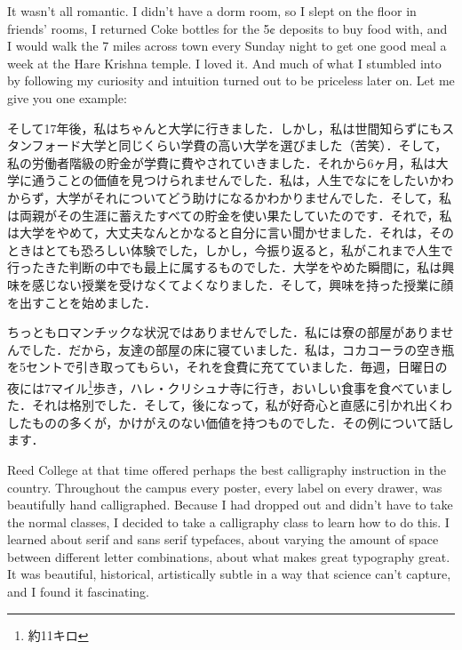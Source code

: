 \documentclass[twocolumn]{jsarticle}
\begin{document}
\vspace{\baselineskip}

It wasn't all romantic. I didn't have a dorm room, so I slept on the floor in friends' rooms, I returned Coke bottles for the 5¢ deposits to buy food with, and I would walk the 7 miles across town every Sunday night to get one good meal a week at the Hare Krishna temple. I loved it. And much of what I stumbled into by following my curiosity and intuition turned out to be priceless later on. Let me give you one example:

\newpage

そして17年後，私はちゃんと大学に行きました．しかし，私は世間知らずにもスタンフォード大学と同じくらい学費の高い大学を選びました（苦笑）．そして，私の労働者階級の貯金が学費に費やされていきました．それから6ヶ月，私は大学に通うことの価値を見つけられませんでした．私は，人生でなにをしたいかわからず，大学がそれについてどう助けになるかわかりませんでした．そして，私は両親がその生涯に蓄えたすべての貯金を使い果たしていたのです．それで，私は大学をやめて，大丈夫なんとかなると自分に言い聞かせました．それは，そのときはとても恐ろしい体験でした，しかし，今振り返ると，私がこれまで人生で行ったきた判断の中でも最上に属するものでした．大学をやめた瞬間に，私は興味を感じない授業を受けなくてよくなりました．そして，興味を持った授業に顔を出すことを始めました．

ちっともロマンチックな状況ではありませんでした．私には寮の部屋がありませんでした．だから，友達の部屋の床に寝ていました．私は，コカコーラの空き瓶を5セントで引き取ってもらい，それを食費に充てていました．毎週，日曜日の夜には7マイル\footnote{約11キロ}歩き，ハレ・クリシュナ寺に行き，おいしい食事を食べていました．それは格別でした．そして，後になって，私が好奇心と直感に引かれ出くわしたものの多くが，かけがえのない価値を持つものでした．その例について話します．

\newpage

Reed College at that time offered perhaps the best calligraphy instruction in the country. Throughout the campus every poster, every label on every drawer, was beautifully hand calligraphed. Because I had dropped out and didn't have to take the normal classes, I decided to take a calligraphy class to learn how to do this. I learned about serif and sans serif typefaces, about varying the amount of space between different letter combinations, about what makes great typography great. It was beautiful, historical, artistically subtle in a way that science can't capture, and I found it fascinating.

\vspace{\baselineskip}
\end{document}
